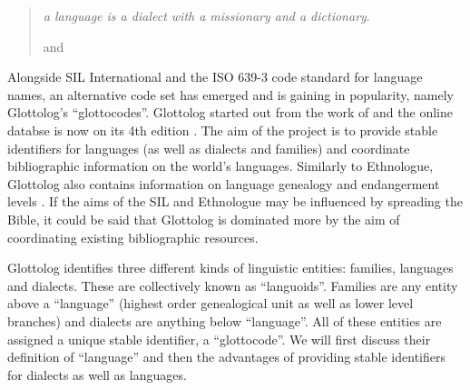 \documentclass[12pt,letterpaper]{article}
\begin{document}
\begin{quotation}
\noindent \emph{a language is a dialect with a missionary and a dictionary}.
\begin{flushright}
\citet{lupkestorch2013} and \citet{blommaert2008artefactual}
\end{flushright}
\end{quotation}



Alongside SIL International and the ISO 639-3 code standard for language names, an alternative code set has emerged and is gaining in popularity, namely Glottolog's ``glottocodes''. Glottolog started out from the work of \citet{nordhoff2011glottolog} and the online databse is now on its 4th edition \citep{glottolog40}. The aim of the project is to provide stable identifiers for languages (as well as dialects and families) and coordinate bibliographic information on the world's languages. Similarly to Ethnologue, Glottolog also contains information on language genealogy and endangerment levels \citep{hammarstrom2018simultaneous}. If the aims of the SIL and Ethnologue may be influenced by spreading the Bible, it could be said that Glottolog is dominated more by the aim of coordinating existing bibliographic resources.

Glottolog identifies three different kinds of linguistic entities: families, languages and dialects. These are collectively known as ``languoids''. Families are any entity above a ``language'' (highest order genealogical unit as well as lower level branches) and dialects are anything below ``language''. All of these entities are assigned a unique stable identifier, a ``glottocode''. We will first discuss their definition of ``language'' and then the advantages of providing stable identifiers for dialects as well as languages.
\end{document}

